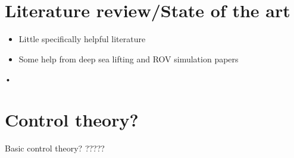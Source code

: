 \section{Literature review/State of the art}
\begin{itemize}
\item Little specifically helpful literature
\item Some help from deep sea lifting and ROV simulation papers

\end{itemize}•

\section{Control theory?}
Basic control theory? ?????